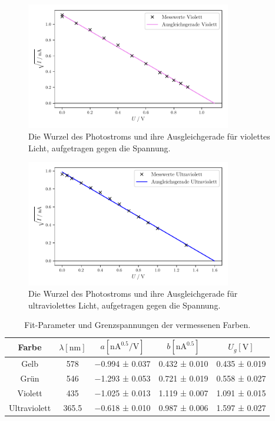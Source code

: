 \begin{figure}[H]
    \centering
    \includegraphics[width=0.8\textwidth]{build/plot_sqrt_violett.pdf}
    \caption{Die Wurzel des Photostroms und ihre Ausgleichgerade für violettes Licht, aufgetragen gegen die Spannung.}
    \label{fig:plot_sqrt_violett}
\end{figure}

\begin{figure}[H]
    \centering
    \includegraphics[width=0.8\textwidth]{build/plot_sqrt_ultraviolett.pdf}
    \caption{Die Wurzel des Photostroms und ihre Ausgleichgerade für ultraviolettes Licht, aufgetragen gegen die Spannung.}
    \label{fig:plot_sqrt_ultraviolett}
\end{figure}

\begin{table}
  \centering
  \caption{Fit-Parameter und Grenzspannungen der vermessenen Farben.}
  \label{tab:grenzspannungen}
  \begin{tabular}{c S c c c}
  \toprule
  Farbe &
  $\lambda [\si{\nano\meter}]$ &
  $a [\si{\nano\ampere\tothe{0.5}\per\volt}]$ &
  $b [\si{\nano\ampere\tothe{0.5}}]$ &
  $U_g [\si{\volt}]$ \\
  \midrule
  Gelb         & 578   & \num{-0.994} ± \num{0.037} & \num{0.432} ± \num{0.010} & \num{0.435} ± \num{0.019} \\
  Grün         & 546   & \num{-1.293} ± \num{0.053} & \num{0.721} ± \num{0.019} & \num{0.558} ± \num{0.027} \\
  Violett      & 435   & \num{-1.025} ± \num{0.013} & \num{1.119} ± \num{0.007} & \num{1.091} ± \num{0.015} \\
  Ultraviolett & 365.5 & \num{-0.618} ± \num{0.010} & \num{0.987} ± \num{0.006} & \num{1.597} ± \num{0.027} \\
  \bottomrule
  \end{tabular}
\end{table}

